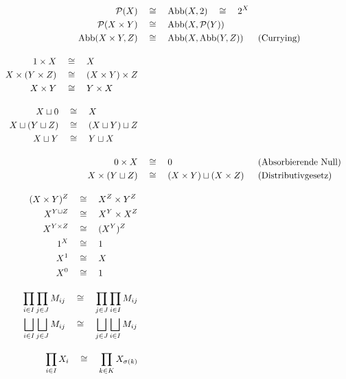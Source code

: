 \begin{align*}
    \calP(X) & \quad\cong\quad \Abb(X,2) \quad\cong\quad 2^X \\
    \calP(X\times Y) & \quad\cong\quad \Abb(X,\calP(Y)) \\
    \Abb(X\times Y,Z) & \quad\cong\quad \Abb(X,\Abb(Y,Z)) && (\text{Currying}) \\[1em]
    \begin{split}
        1 \times X & \quad\cong\quad X \\
        X\times (Y\times Z) & \quad\cong\quad (X\times Y) \times Z \\
        X\times Y & \quad\cong\quad Y\times X
    \end{split} \\[1em]
    \begin{split}
        X\sqcup 0 & \quad\cong\quad X \\
        X \sqcup ( Y\sqcup Z) & \quad\cong\quad (X\sqcup Y)\sqcup Z \\
        X \sqcup Y & \quad\cong\quad Y\sqcup X
    \end{split} \\[1em]
        0 \times X & \quad\cong\quad 0 && (\text{Absorbierende Null}) \\
        X \times (Y\sqcup Z) & \quad\cong\quad (X\times Y)\sqcup (X\times Z) && (\text{Distributivgesetz}) \\[1em]
    \begin{split}
        (X\times Y)^Z & \quad\cong\quad X^Z \times Y^Z \\
        X^{Y\sqcup Z} & \quad\cong\quad X^Y \times X^Z \\
        X^{Y\times Z} & \quad\cong\quad (X^Y)^Z \\
        1^X & \quad\cong\quad 1 \\
        X^1 & \quad\cong\quad X \\
        X^0 & \quad\cong\quad 1
    \end{split} \\[1em]
    \begin{split}
        \prod_{i\in I} \prod_{j\in J} M_{ij} & \quad\cong\quad \prod_{j\in J} \prod_{i\in I} M_{ij} \\
        \bigsqcup_{i\in I} \bigsqcup_{j\in J} M_{ij} & \quad\cong\quad \bigsqcup_{j\in J} \bigsqcup_{i\in I} M_{ij}
    \end{split} \\[1em]
    \begin{split}
    \prod_{i\in I} X_i & \quad\cong\quad \prod_{k\in K} X_{\sigma(k)} \\

\end{split}
\end{align*}
